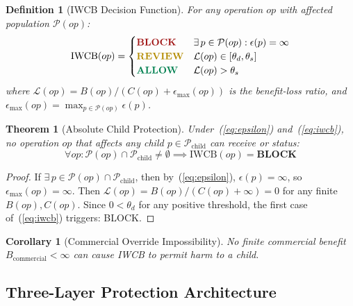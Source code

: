 \documentclass[conference]{IEEEtran}
\newtheorem{theorem}{Theorem}
\newtheorem{definition}{Definition}
\newtheorem{corollary}{Corollary}
\begin{document}
\begin{definition}[IWCB Decision Function]
For any operation $op$ with affected population $\mathcal{P}(op)$:
\begin{equation}
  \text{IWCB}(op) =
  \begin{cases}
    \textcolor{guardRed}{\mathbf{BLOCK}} &
    \exists\, p \in \mathcal{P}(op): \epsilon(p) = \infty \\
    \textcolor{goldYellow}{\mathbf{REVIEW}} &
    \mathcal{L}(op) \in [\theta_d, \theta_s] \\
    \textcolor{jadeGreen}{\mathbf{ALLOW}} &
    \mathcal{L}(op) > \theta_s
  \end{cases}
  \label{eq:iwcb}
\end{equation}
where $\mathcal{L}(op) = B(op) / (C(op) + \epsilon_{\max}(op))$
is the benefit-loss ratio, and
$\epsilon_{\max}(op) = \max_{p \in \mathcal{P}(op)} \epsilon(p)$.
\end{definition}

\begin{theorem}[Absolute Child Protection]
Under~(\ref{eq:epsilon}) and~(\ref{eq:iwcb}),
no operation $op$ that affects any child
$p \in \mathcal{P}_{\text{child}}$ can receive
 or  status:
\begin{equation}
  \forall op: \mathcal{P}(op) \cap \mathcal{P}_{\text{child}}
  \neq \emptyset
  \implies \text{IWCB}(op) = \textbf{BLOCK}
\end{equation}
\end{theorem}

\begin{proof}
If $\exists\, p \in \mathcal{P}(op) \cap \mathcal{P}_{\text{child}}$,
then by~(\ref{eq:epsilon}), $\epsilon(p) = \infty$,
so $\epsilon_{\max}(op) = \infty$.
Then $\mathcal{L}(op) = B(op)/(C(op) + \infty) = 0$
for any finite $B(op), C(op)$.
Since $0 < \theta_d$ for any positive threshold,
the first case of~(\ref{eq:iwcb}) triggers: BLOCK.
\end{proof}

\begin{corollary}[Commercial Override Impossibility]
No finite commercial benefit $B_{\text{commercial}} < \infty$
can cause IWCB to permit harm to a child.
\end{corollary}

\subsection{Three-Layer Protection Architecture}
\end{document}
